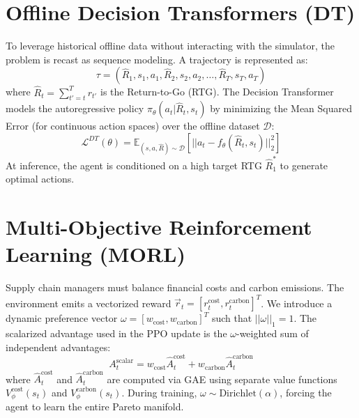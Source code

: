 \documentclass[11pt,a4paper]{article}
\begin{document}
\section{Offline Decision Transformers (DT)}
To leverage historical offline data without interacting with the simulator, the problem is recast as sequence modeling.
A trajectory is represented as:
\begin{equation}
    \tau = (\hat{R}_1, s_1, a_1, \hat{R}_2, s_2, a_2, \dots, \hat{R}_T, s_T, a_T)
\end{equation}
where $\hat{R}_t = \sum_{t'=t}^T r_{t'}$ is the Return-to-Go (RTG).
The Decision Transformer models the autoregressive policy $\pi_\theta(a_t | \hat{R}_t, s_t)$ by minimizing the Mean Squared Error (for continuous action spaces) over the offline dataset $\mathcal{D}$:
\begin{equation}
    \mathcal{L}^{DT}(\theta) = \mathbb{E}_{(s, a, \hat{R}) \sim \mathcal{D}} \left[ || a_t - f_\theta(\hat{R}_t, s_t) ||_2^2 \right]
\end{equation}
At inference, the agent is conditioned on a high target RTG $\hat{R}_1^*$ to generate optimal actions.

\section{Multi-Objective Reinforcement Learning (MORL)}
Supply chain managers must balance financial costs and carbon emissions. The environment emits a vectorized reward $\vec{r}_t = [r_t^{\text{cost}}, r_t^{\text{carbon}}]^T$.
We introduce a dynamic preference vector $\omega = [w_{\text{cost}}, w_{\text{carbon}}]^T$ such that $||\omega||_1 = 1$.
The scalarized advantage used in the PPO update is the $\omega$-weighted sum of independent advantages:
\begin{equation}
    A_t^{\text{scalar}} = w_{\text{cost}} \hat{A}_t^{\text{cost}} + w_{\text{carbon}} \hat{A}_t^{\text{carbon}}
\end{equation}
where $\hat{A}_t^{\text{cost}}$ and $\hat{A}_t^{\text{carbon}}$ are computed via GAE using separate value functions $V_\phi^{\text{cost}}(s_t)$ and $V_\phi^{\text{carbon}}(s_t)$.
During training, $\omega \sim \text{Dirichlet}(\alpha)$, forcing the agent to learn the entire Pareto manifold.
\end{document}
